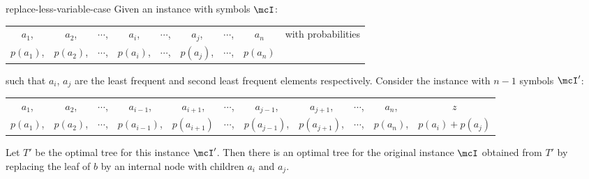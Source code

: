 \begin{Theorem}{}{replace-less-variable-case}
	Given an instance with symbols $\mcI$: \begin{center}
		\begin{tabular}{ccccccccc}
			$a_1$, & $a_2$, & $\cdots$, & $a_i$, & $\cdots$, & $a_j$, & $\cdots$, & $a_n$ & with probabilities\\
			$p(a_1)$, & $p(a_2)$, & $\cdots$, & $p(a_i)$, & $\cdots$, & $p(a_j)$, & $\cdots$, & $p(a_n)$ &
		\end{tabular} 
	\end{center}
	such that $a_i$, $a_j$ are the least frequent and second least frequent elements respectively. Consider the instance with $n-1$ symbols $\mcI'$:
	\begin{center}
		\begin{tabular}{ccccccccccc}
			$a_1$, & $a_2$, & $\cdots$, & $a_{i-1}$, & $a_{i+1}$,& $\cdots$, & $a_{j-1}$,& $a_{j+1}$, & $\cdots$, & $a_n$, & $z$ \\
			$p(a_1)$, & $p(a_2)$, & $\cdots$, & $p(a_{i-1})$,&$p(a_{i+1})$  & $\cdots$, & $p(a_{j-1})$,& $p(a_{j+1})$, & $\cdots$, & $p(a_n)$, & $p(a_i)+p(a_j)$ 
		\end{tabular} 
	\end{center}
	Let $T'$ be the optimal tree for this instance $\mcI'$. Then there is an optimal tree for the original instance $\mcI$ obtained from $T'$ by replacing the leaf of $b$ by an internal node with children $a_i$ and $a_j$.
\end{Theorem}
